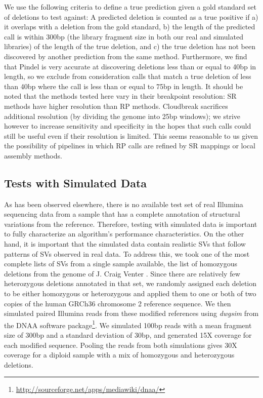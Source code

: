 \documentclass[11pt]{article}
\begin{document}
We use the following criteria to define a true prediction given a gold standard set of deletions to test against: A predicted deletion is counted as a true positive if a) it overlaps with a deletion from the gold standard, b) the length of the predicted call is within 300bp (the library fragment size in both our real and simulated libraries) of the length of the true deletion, and c) the true deletion has not been discovered by another prediction from the same method. Furthermore, we find that Pindel is very accurate at discovering deletions less than or equal to 40bp in length, so we exclude from consideration calls that match a true deletion of less than 40bp where the call is less than or equal to 75bp in length. It should be noted that the methods tested here vary in their breakpoint resolution: SR methods have higher resolution than RP methods. Cloudbreak sacrifices additional resolution (by dividing the genome into 25bp windows); we strive however to increase sensitivity and specificity in the hopes that such calls could still be useful even if their resolution is limited. This seems reasonable to us given the possibility of pipelines in which RP calls are refined by SR mappings or local assembly methods.

\subsection{Tests with Simulated Data}

As has been observed elsewhere, there is no available test set of real Illumina sequencing data from a sample that has a complete annotation of structural variations from the reference. Therefore, testing with simulated data is important to fully characterize an algorithm's performance characteristics. On the other hand, it is important that the simulated data contain realistic SVs that follow patterns of SVs observed in real data. To address this, we took one of the most complete lists of SVs from a single sample available, the list of homozygous deletions from the genome of J. Craig Venter \autocite{Levy:2007fb}. Since there are relatively few heterozygous deletions annotated in that set, we randomly assigned each deletion to be either homozygous or heterozygous and applied them to one or both of two copies of the human GRCh36 chromosome 2 reference sequence. We then simulated paired Illumina reads from these modified references using \emph{dwgsim} from the DNAA software package\footnote{\url{http://sourceforge.net/apps/mediawiki/dnaa/}}. We simulated 100bp reads with a mean fragment size of 300bp and a standard deviation of 30bp, and generated 15X coverage for each modified sequence. Pooling the reads from both simulations gives 30X coverage for a diploid sample with a mix of homozygous and heterozygous deletions.
\end{document}
